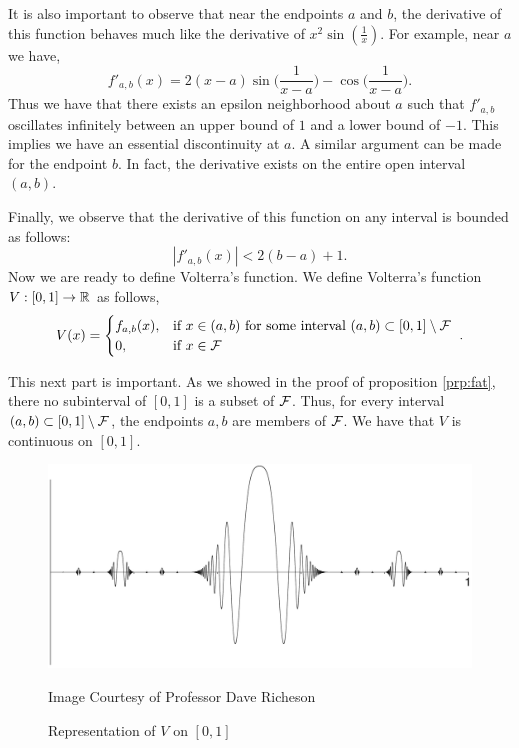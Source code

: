 \documentclass{article}
\theoremstyle{axiom} \newtheorem{axiom}{Axiom}
\theoremstyle{definition} \newtheorem{definition}{Definition}
\theoremstyle{example} \newtheorem{example}{Example}
\theoremstyle{proposition} \newtheorem{prop}{Proposition}
\theoremstyle{lemma} \newtheorem{lemma}{Lemma}
\begin{document}
It is also important to observe that near the endpoints $a$ and $b$, the
derivative of this function behaves much like the derivative of 
$x^2\sin(\frac{1}{x})$. For example, near $a$ we have,
\begin{equation*}
	f'_{a,b}(x) = 2(x-a)\sin\bigg(\frac{1}{x-a}\bigg)
		-\cos\bigg(\frac{1}{x-a}\bigg).
\end{equation*}
Thus we have that there exists an epsilon neighborhood about
$a$ such that $f'_{a,b}$ oscillates infinitely between an upper bound of $1$ and
a lower bound of $-1$. This implies we have an essential discontinuity at $a$. 
A similar argument can be made for the endpoint $b$. In fact, the derivative
exists on the entire open interval $(a,b)$.

Finally, we observe that the derivative of this function on any interval is
bounded as follows:
\begin{equation*}
	|f'_{a,b}(x)| < 2(b-a)+1.
\end{equation*}
Now we are ready to define Volterra's function. We define Volterra's function 
$V:[0,1]\rightarrow \mathbb{R}$ as follows,
\begin{equation}
	V(x) = \begin{cases}
		f_{a,b}(x), & \text{if $x \in (a,b)$ for some interval $(a,b) \subset [0,1]\setminus \mathcal{F}$ }\\
		0, & \text{if $x \in \mathcal{F}$}
	\end{cases}.
\end{equation}

This next part is important. As we showed in the proof of proposition
\ref{prp:fat}, there no subinterval of $[0,1]$ is a subset of $\mathcal{F}$. 
Thus, for every interval $(a,b) \subset [0,1] \setminus \mathcal{F}$, the endpoints
$a,b$ are members of $\mathcal{F}$. We have that $V$ is continuous on $[0,1]$.

\begin{figure}[H]
	\centering
	\includegraphics[width=\textwidth/2]{img/volterra-func.jpeg}
	\caption{Representation of $V$ on $[0,1]$}
	\tiny{Image Courtesy of Professor Dave Richeson}
\end{figure}
\end{document}
